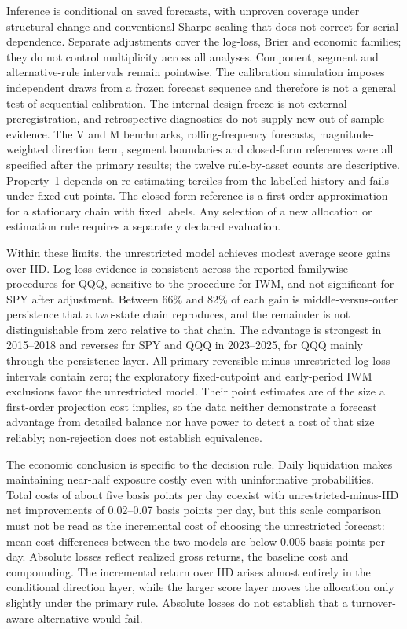 Inference is conditional on saved forecasts, with unproven coverage under structural change and conventional Sharpe scaling that does not correct for serial dependence. Separate adjustments cover the log-loss, Brier and economic families; they do not control multiplicity across all analyses. Component, segment and alternative-rule intervals remain pointwise. The calibration simulation imposes independent draws from a frozen forecast sequence and therefore is not a general test of sequential calibration. The internal design freeze is not external preregistration, and retrospective diagnostics do not supply new out-of-sample evidence. The V and M benchmarks, rolling-frequency forecasts, magnitude-weighted direction term, segment boundaries and closed-form references were all specified after the primary results; the twelve rule-by-asset counts are descriptive. Property~1 depends on re-estimating terciles from the labelled history and fails under fixed cut points. The closed-form reference is a first-order approximation for a stationary chain with fixed labels. Any selection of a new allocation or estimation rule requires a separately declared evaluation.

Within these limits, the unrestricted model achieves modest average score gains over IID. Log-loss evidence is consistent across the reported familywise procedures for QQQ, sensitive to the procedure for IWM, and not significant for SPY after adjustment. Between 66\% and 82\% of each gain is middle-versus-outer persistence that a two-state chain reproduces, and the remainder is not distinguishable from zero relative to that chain. The advantage is strongest in 2015--2018 and reverses for SPY and QQQ in 2023--2025, for QQQ mainly through the persistence layer. All primary reversible-minus-unrestricted log-loss intervals contain zero; the exploratory fixed-cutpoint and early-period IWM exclusions favor the unrestricted model. Their point estimates are of the size a first-order projection cost implies, so the data neither demonstrate a forecast advantage from detailed balance nor have power to detect a cost of that size reliably; non-rejection does not establish equivalence.

The economic conclusion is specific to the decision rule. Daily liquidation makes maintaining near-half exposure costly even with uninformative probabilities. Total costs of about five basis points per day coexist with unrestricted-minus-IID net improvements of 0.02--0.07 basis points per day, but this scale comparison must not be read as the incremental cost of choosing the unrestricted forecast: mean cost differences between the two models are below 0.005 basis points per day. Absolute losses reflect realized gross returns, the baseline cost and compounding. The incremental return over IID arises almost entirely in the conditional direction layer, while the larger score layer moves the allocation only slightly under the primary rule. Absolute losses do not establish that a turnover-aware alternative would fail.

